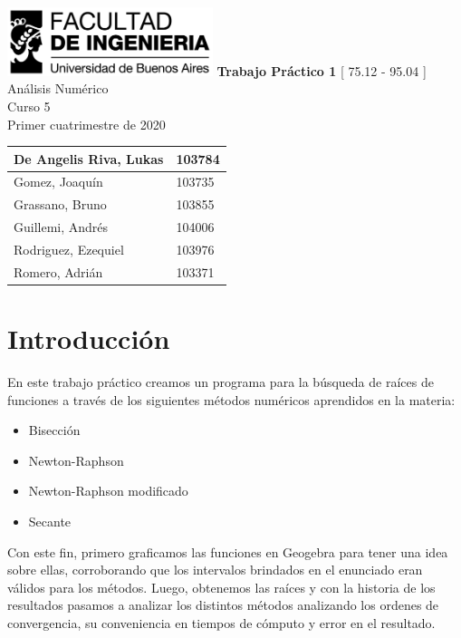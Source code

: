 \documentclass[titlepage,a4paper]{article}
\begin{document}
\begin{titlepage} %
	\hfill\includegraphics[width=6cm]{logofiuba.jpg}
    \centering
    \vfill
    \Huge \textbf{Trabajo Práctico 1}
    \vskip2cm
    \Large [ 75.12 - 95.04 ] Análisis Numérico\\
    Curso 5 \\ 
    Primer cuatrimestre de 2020\\
    \vfill
    \begin{tabular}{ | l | l | } %
      \hline
        De Angelis Riva, Lukas & 103784 \\ \hline
        Gomez, Joaquín & 103735 \\ \hline
        Grassano, Bruno & 103855 \\ \hline
        Guillemi, Andrés & 104006\\ \hline 
        Rodriguez, Ezequiel & 103976 \\ \hline
        Romero, Adrián & 103371 \\ \hline
  	\end{tabular}
    \vfill
    \vfill
    \vfill
\end{titlepage}

\tableofcontents %

\newpage

\section{Introducción}\label{sec:intro}
En este trabajo práctico creamos un programa para la búsqueda de raíces de funciones a través de los siguientes métodos numéricos aprendidos en la materia:
\begin{itemize}
    \item Bisección
    \item Newton-Raphson
    \item Newton-Raphson modificado
    \item Secante
\end{itemize}


Con este fin, primero graficamos las funciones en Geogebra para tener una idea sobre ellas, corroborando que los intervalos brindados en el enunciado eran válidos para los métodos. Luego, obtenemos las raíces y con la historia de los resultados pasamos a analizar los distintos métodos analizando los ordenes de convergencia, su conveniencia en tiempos de cómputo y error en el resultado.
\end{document}
